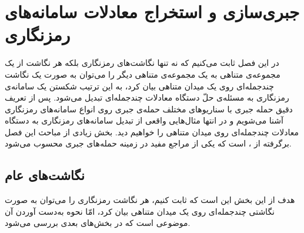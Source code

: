 \chapter{جبری‌سازی و استخراج معادلات سامانه‌های رمزنگاری}
در این فصل ثابت می‌کنیم که نه تنها نگاشت‌های رمزنگاری بلکه هر نگاشت از یک مجموعه‌ی متناهی به یک مجموعه‌ی متناهی دیگر  را می‌توان به صورت یک نگاشت چندجمله‌ای روی یک میدان متناهی  بیان کرد، به این ترتیب شکستن یک سامانه‌ی رمزنگاری به مسئله‌ی حلّ دستگاه معادلات چندجمله‌ای تبدیل می‌شود. پس از تعریف دقیق حمله‌  جبری با سناریوهای مختلف حمله‌ی جبری روی انواع سامانه‌های رمزنگاری آشنا می‌شویم و در انتها مثال‌هایی واقعی از تبدیل سامانه‌های رمزنگاری به دستگاه معادلات چندجمله‌ای روی میدان متناهی را خواهیم دید. بخش زیادی از مباحث این فصل برگرفته از 
\cite{bard2009algebraic}، 
است که یکی از مراجع مفید در زمینه‌ حمله‌های جبری محسوب می‌شود.
\section{نگاشت‌های عام}
هدف از این بخش این است که ثابت کنیم، هر نگاشت رمزنگاری را می‌توان به صورت نگاشتی چندجمله‌ای روی یک میدان متناهی بیان کرد، امّا نحوه‌  به‌دست آوردن آن موضوعی است که در بخش‌های بعدی بررسی می‌شود. 

